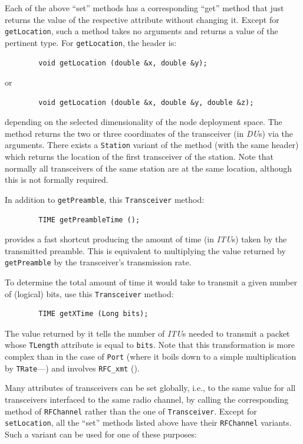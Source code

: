 Each of the above ``set'' methods has a corresponding ``get'' method that
just returns the value of the respective attribute without changing it.
Except for {\tt getLocation}, such a method takes no arguments and
returns a value of the pertinent type.
For {\tt getLocation}, the header is:
\begin{verbatim}
        void getLocation (double &x, double &y);
\end{verbatim}
\noindent
or
\begin{verbatim}
        void getLocation (double &x, double &y, double &z);
\end{verbatim}
\noindent
depending on the selected dimensionality of the node deployment space.
The method returns the two or three coordinates of the transceiver
(in {\em DU\/}s) via the arguments.
There exists a {\tt Station} variant of the method (with the same header)
which returns the location of the first transceiver of the station.
Note that normally all transceivers of the same station are at the same
location, although this is not formally required.

In addition to {\tt getPreamble}, this {\tt Transceiver} method:
\begin{verbatim}
        TIME getPreambleTime ();
\end{verbatim}
provides a fast shortcut producing the amount of time (in {\em ITU\/}s) taken
by the transmitted preamble.
This is equivalent to multiplying the value returned by
{\tt getPreamble} by the transceiver's transmission rate.

To determine the total amount of time it would take to transmit a given number
of (logical) bits, use this {\tt Transceiver} method:
\begin{verbatim}
        TIME getXTime (Long bits);
\end{verbatim}
\noindent
The value returned by it tells the number of {\em ITU\/}s needed to transmit
a packet whose {\tt TLength} attribute is equal to {\tt bits}.
Note that this transformation is more complex than in the case of {\tt Port}
(where it boils down to a simple multiplication by
{\tt TRate}---) and involves {\tt RFC\_xmt}
().

Many attributes of transceivers can be set globally, i.e., to the same value
for all transceivers interfaced to the same radio channel, by calling the
corresponding method of {\tt RFChannel} rather than the one of
{\tt Transceiver}.
Except for {\tt setLocation}, all the ``set'' methods listed above
have their {\tt RFChannel} variants.
Such a variant can be used for one of these purposes:

